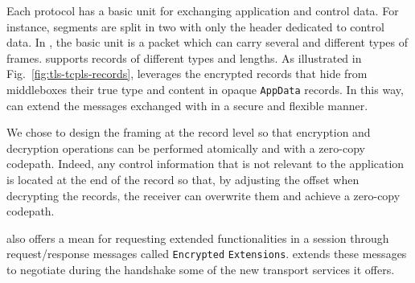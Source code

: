 Each protocol has a basic unit for exchanging application and control data.
For instance, \tcp segments are split in two with only the header dedicated to control data. In \quic, the basic unit is a \quic packet which can carry several and different types of \quic frames. \tls supports \tls records of different types and lengths.  As illustrated in Fig.~\ref{fig:tls-tcpls-records}, \tcpls leverages the \tls encrypted records that hide from middleboxes their true type and content in opaque \texttt{AppData} records. In this way, \tcpls can extend the messages exchanged with \tls in a secure and flexible manner.

We chose to design the \tcpls framing at the \tls record level so that
encryption and decryption operations can be performed atomically and with
a zero-copy codepath. Indeed, any \tcpls control information that is not relevant to the application is
located at the end of the record so that, by adjusting the offset when
decrypting the \tcpls records, the receiver can overwrite them and achieve a zero-copy codepath.


\tls also offers a mean for requesting extended functionalities in a \tls
session through request/response messages called \tls \texttt{Encrypted}
\texttt{Extensions}.
\tcpls extends these messages to negotiate during the handshake some of the new
transport services it offers.

